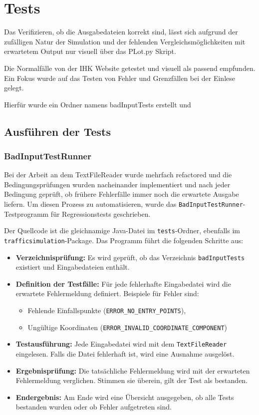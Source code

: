 \chapter{Tests}

Das Verifizieren, ob die Ausgabedateien korrekt sind,
lässt sich aufgrund der zufälligen Natur der Simulation und der fehlenden Vergleichsmöglichkeiten mit erwartetem Output
nur visuell über das PLot.py Skript.

Die Normalfälle von der IHK Website getestet und visuell als passend empfunden.
Ein Fokus wurde auf das Testen von Fehler und Grenzfällen bei der Einlese gelegt.

Hierfür wurde ein Ordner namens badInputTests erstellt und

\section{Ausführen der Tests}

\subsection{BadInputTestRunner}

Bei der Arbeit an dem TextFileReader wurde mehrfach refactored und die Bedingungsprüfungen wurden nacheinander implementiert und nach jeder Bedingung geprüft, 
ob frühere Fehlerfälle immer noch die erwartete Ausgabe liefern. 
Um diesen Prozess zu automatisieren, wurde das \texttt{BadInputTestRunner}-Testprogramm für Regressionstests geschrieben.

Der Quellcode ist die gleichnamige Java-Datei im \texttt{tests}-Ordner, ebenfalls im \\
\texttt{trafficsimulation}-Package. 
Das Programm führt die folgenden Schritte aus:

\begin{itemize}
    \item \textbf{Verzeichnisprüfung:} Es wird geprüft, ob das Verzeichnis \texttt{badInputTests} existiert und Eingabedateien enthält.
    \item \textbf{Definition der Testfälle:} Für jede fehlerhafte Eingabedatei wird die erwartete Fehlermeldung definiert. Beispiele für Fehler sind:
    \begin{itemize}
        \item Fehlende Einfallspunkte (\texttt{ERROR\_NO\_ENTRY\_POINTS}),
        \item Ungültige Koordinaten (\texttt{ERROR\_INVALID\_COORDINATE\_COMPONENT})
    \end{itemize}
    \item \textbf{Testausführung:} Jede Eingabedatei wird mit dem \texttt{TextFileReader} eingelesen. Falls die Datei fehlerhaft ist, wird eine Ausnahme ausgelöst.
    \item \textbf{Ergebnisprüfung:} Die tatsächliche Fehlermeldung wird mit der erwarteten Fehlermeldung verglichen. Stimmen sie überein, gilt der Test als bestanden.
    \item \textbf{Endergebnis:} Am Ende wird eine Übersicht ausgegeben, ob alle Tests bestanden wurden oder ob Fehler aufgetreten sind.
\end{itemize}


